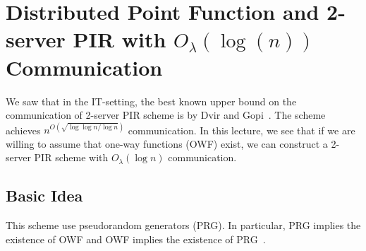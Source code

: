 \newcommand{\PRF}{\ensuremath{{\sf PRF}}}
\newcommand{\FHE}{\ensuremath{{\sf FHE}}}
\newcommand{\Gen}{\ensuremath{{\sf Gen}}}
\newcommand{\Eval}{\ensuremath{{\sf Eval}}}
\newcommand{\DpfGen}{\ensuremath{{\sf DPF.Gen}}}
\newcommand{\DpfEval}{\ensuremath{{\sf DPF.Eval}}}
\newcommand{\Enc}{\ensuremath{{\sf Enc}}}
\newcommand{\Dec}{\ensuremath{{\sf Dec}}}
\newcommand{\Dpf}{\ensuremath{{\sf DPF}}}
\newcommand{\DPF}{\ensuremath{{\sf DPF}}}
\newcommand{\Prg}{\ensuremath{{\sf PRG}}}
\newcommand{\Pbc}{\ensuremath{{\sf PBC}}}
\newcommand{\Seed}{\ensuremath{{\sf Seed}}}
\newcommand{\DB}{\ensuremath{{\sf DB}}}
\newcommand{\Comm}{\ensuremath{{\sf Comm}}}
\newcommand{\GenSched}{\ensuremath{{\sf GenSchedule}}}
\newcommand{\ServerPre}{\ensuremath{{\sf ServerPreprocess}}}
\newcommand{\ClientQ}{\ensuremath{{\sf ClientQuery}}}
\newcommand{\ServerA}{\ensuremath{{\sf ServerAnswer}}}
\newcommand{\ClientD}{\ensuremath{{\sf ClientDecode}}}
\newtheorem{notation}{Notation}
\newcommand{\xor}{\ensuremath{\oplus}}
\newcommand{\Sim}{\ensuremath{{\sf Sim}}}
\newcommand{\negl}{\ensuremath{{\sf negl}}}
\newcommand{\get}{\ensuremath{\leftarrow}}
\newcommand{\Client}{\textsf{Client}~}
\newcommand{\Server}{\textsf{Server}~}
\newcommand{\CV}{\ensuremath{{\sf CV}}}
\newcommand{\key}{\ensuremath{{\sf key}}}
\newcommand{\getr}{\ensuremath{~{\overset{\$}{\leftarrow}}}~}
\newcommand{\ignore}[1]{}

\section{Distributed Point Function and 2-server PIR with $O_{\lambda}(\log(n))$ Communication ~\cite{boyle2016function}}

We saw that in the IT-setting, the best known upper bound on the communication of 2-server PIR scheme is by Dvir and Gopi~\cite{dvir20162}.
The scheme achieves $n^{O(\sqrt{\log \log n / \log n})}$ communication.
In this lecture, we see that if we are willing to assume that one-way functions (OWF) exist, we can construct a 2-server PIR scheme with $O_\lambda(\log n)$ communication.

\subsection{Basic Idea}
This scheme use pseudorandom generators (PRG). In particular, PRG implies the existence of OWF and OWF implies the existence of PRG~\cite{haastad1999pseudorandom}. 

